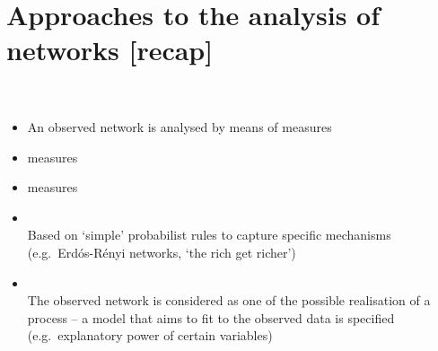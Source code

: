 \documentclass[8pt]{beamer}
\begin{document}
\begin{frame}
\frametitle{\insertsection}
\tableofcontents
\end{frame}



\section{Approaches to the analysis of networks [recap]}

\bgroup
{}
\begin{frame}[plain]{}
\begin{center}
\color{white}{\Huge\insertsection}
\end{center}
\end{frame}
\egroup


\begin{frame}
\frametitle{\insertsection}


{\color{blue}{Descriptive network analysis}}\\ 
    \begin{itemize}
    \item An observed network is analysed by means of measures
    \item {\color{blue}{Network-level}} measures
    \item {\color{blue}{Node-level}} measures
    \end{itemize}

\bigskip
	
{\color{blue}{Modelling and inference of networks}}
    \begin{itemize}
    \item {\color{blue}{Mathematical models}}\\
    Based on `simple' probabilist rules to capture specific mechanisms (e.g.\ Erd\'os-R\'enyi networks, `the rich get richer')		
    \item {\color{blue}{Statistical models}}\\ 
    The observed network is considered as one of the possible realisation of a process -- a model that aims to fit to the observed data is specified (e.g.\ explanatory power of certain variables)
    \end{itemize}


\end{frame}
\end{document}
